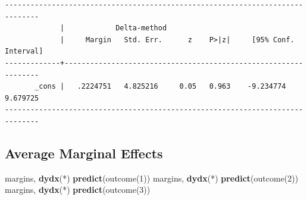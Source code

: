 \documentclass[
]{book}
\newenvironment{Shaded}{\begin{snugshade}}{\end{snugshade}}
\newcommand{\KeywordTok}[1]{\textcolor[rgb]{0.13,0.29,0.53}{\textbf{#1}}}
\newcommand{\NormalTok}[1]{#1}
\begin{document}
\begin{verbatim}
------------------------------------------------------------------------------
             |            Delta-method
             |     Margin   Std. Err.      z    P>|z|     [95% Conf. Interval]
-------------+----------------------------------------------------------------
       _cons |   .2224751   4.825216     0.05   0.963    -9.234774    9.679725
------------------------------------------------------------------------------
\end{verbatim}

\subsection{Average Marginal Effects}\label{average-marginal-effects}

\begin{Shaded}
\begin{Highlighting}[]
\NormalTok{margins, }\KeywordTok{dydx}\NormalTok{(*) }\KeywordTok{predict}\NormalTok{(outcome(1))}
\NormalTok{margins, }\KeywordTok{dydx}\NormalTok{(*) }\KeywordTok{predict}\NormalTok{(outcome(2))}
\NormalTok{margins, }\KeywordTok{dydx}\NormalTok{(*) }\KeywordTok{predict}\NormalTok{(outcome(3))}
\end{Highlighting}
\end{Shaded}
\end{document}
